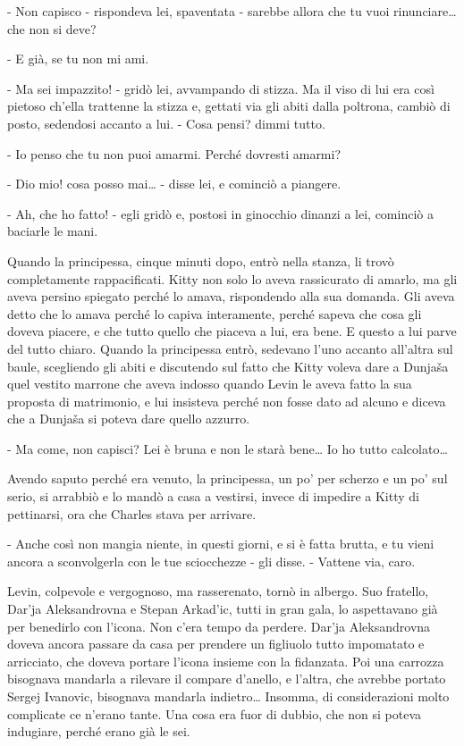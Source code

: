 - Non capisco - rispondeva lei, spaventata - sarebbe allora che tu vuoi rinunciare\ldots{} che non si deve? 

- E già, se tu non mi ami. 

- Ma sei impazzito! - gridò lei, avvampando di stizza. Ma il viso di lui era così pietoso ch'ella trattenne la stizza e, gettati via gli abiti dalla poltrona, cambiò di posto, sedendosi accanto a lui. - Cosa pensi? dimmi tutto. 

- Io penso che tu non puoi amarmi. Perché dovresti amarmi? 

- Dio mio! cosa posso mai\ldots{} - disse lei, e cominciò a piangere. 

- Ah, che ho fatto! - egli gridò e, postosi in ginocchio dinanzi a lei, cominciò a baciarle le mani. 

Quando la principessa, cinque minuti dopo, entrò nella stanza, li trovò completamente rappacificati. Kitty non solo lo aveva rassicurato di amarlo, ma gli aveva persino spiegato perché lo amava, rispondendo alla sua domanda. Gli aveva detto che lo amava perché lo capiva interamente, perché sapeva che cosa gli doveva piacere, e che tutto quello che piaceva a lui, era bene. E questo a lui parve del tutto chiaro. Quando la principessa entrò, sedevano l'uno accanto all'altra sul baule, scegliendo gli abiti e discutendo sul fatto che Kitty voleva dare a Dunjaša quel vestito marrone che aveva indosso quando Levin le aveva fatto la sua proposta di matrimonio, e lui insisteva perché non fosse dato ad alcuno e diceva che a Dunjaša si poteva dare quello azzurro. 

- Ma come, non capisci? Lei è bruna e non le starà bene\ldots{} Io ho tutto calcolato\ldots{} 

Avendo saputo perché era venuto, la principessa, un po' per scherzo e un po' sul serio, si arrabbiò e lo mandò a casa a vestirsi, invece di impedire a Kitty di pettinarsi, ora che Charles stava per arrivare. 

- Anche così non mangia niente, in questi giorni, e si è fatta brutta, e tu vieni ancora a sconvolgerla con le tue sciocchezze - gli disse. - Vattene via, caro. 

Levin, colpevole e vergognoso, ma rasserenato, tornò in albergo. Suo fratello, Dar'ja Aleksandrovna e Stepan Arkad'ic, tutti in gran gala, lo aspettavano già per benedirlo con l'icona. Non c'era tempo da perdere. Dar'ja Aleksandrovna doveva ancora passare da casa per prendere un figliuolo tutto impomatato e arricciato, che doveva portare l'icona insieme con la fidanzata. Poi una carrozza bisognava mandarla a rilevare il compare d'anello, e l'altra, che avrebbe portato Sergej Ivanovic, bisognava mandarla indietro\ldots{} Insomma, di considerazioni molto complicate ce n'erano tante. Una cosa era fuor di dubbio, che non si poteva indugiare, perché erano già le sei. 

